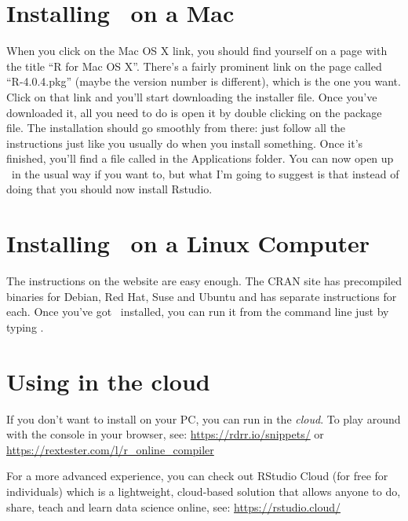 \section{Installing \R\ on a Mac}

When you click on the Mac OS X link, you should find yourself on a page with the title ``R for Mac OS X''. There's a fairly prominent link on the page called ``R-4.0.4.pkg'' (maybe the version number is different), which is the one you want. Click on that link and you'll start downloading the installer file. 
Once you've downloaded it, all you need to do is open it by double clicking on the package file. The installation should go smoothly from there: just follow all the instructions just like you usually do when you install something. Once it's finished, you'll find a file called  in the Applications folder. You can now open up \R\ in the usual way
if you want to, but what I'm going to suggest is that instead of doing that you should now install Rstudio. 

\section{Installing \R\ on a Linux Computer}

The instructions on the website are easy enough. 
The CRAN site has precompiled binaries for Debian, Red Hat, Suse and Ubuntu and has separate instructions for each. Once you've got \R\ installed, you can run it from the command line just by typing . 

\section{Using \R in the cloud}

If you don't want to install \R on your PC, you can run \R in the \textit{cloud}. 
To play around with the console in your browser, see: \websmall \url{https://rdrr.io/snippets/} or \websmall \url{https://rextester.com/l/r_online_compiler}

For a more advanced experience, you can check out RStudio Cloud (for free for individuals) which is a lightweight, cloud-based solution that allows anyone to do, share, teach and learn data science online, see: \websmall \url{https://rstudio.cloud/}



